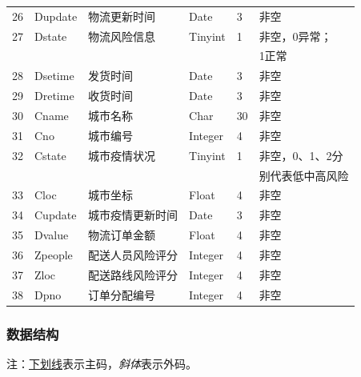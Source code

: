 \documentclass[12pt]{article}
\begin{document}
\begin{center}
\begin{supertabular}{llllll}
	26 &	Dupdate &	物流更新时间 &	Date &	3 &	非空 \\
	27 &	Dstate &	物流风险信息 &	Tinyint &	1 &	非空，0异常； \\ &&&&& 1正常\\
	28 & Dsetime & 发货时间 & Date & 3 & 非空 \\
	29 & Dretime & 收货时间 & Date & 3 & 非空 \\
	30 &	Cname &	城市名称 &	Char &	30 	& 非空 \\
	31 &	Cno &	城市编号 &	Integer &	4 &	非空 \\
	32 &	Cstate &	城市疫情状况 &	Tinyint &	1 &	 非空，0、1、2分\\ &&&&& 别代表低中高风险 \\
	33 &	Cloc &	城市坐标 &	Float &	4 &	非空 \\
	34 &	Cupdate &	城市疫情更新时间 &	Date &	3 &	非空 \\
	35 &	Dvalue 	& 物流订单金额 	& Float &	4 &	非空 \\
	36 &	Zpeople & 配送人员风险评分 & Integer & 4 & 非空 \\
	37 &	Zloc & 配送路线风险评分 & Integer & 4 & 非空 \\
	38 &	Dpno & 订单分配编号 & Integer & 4 & 非空 \\
\end{supertabular}
\end{center}

\subsubsection{数据结构}

注：\underline{下划线}表示主码，\textit{斜体}表示外码。
\vspace{0.2cm}
\tabletail{\bottomrule}
\end{document}
